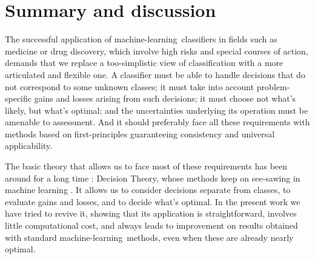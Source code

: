 \documentclass[a4paper,12pt,%
onecolumn,oneside,article,%
british%
]{memoir}
\newcommand*{\puzzle}{{\fontencoding{U}\fontfamily{fontawesometwo}\selectfont\symbol{225}}}
\newcommand{\mynotez}[1]{{\footnotesize\color{notecolour}\puzzle\ #1}}
\newcommand*{\p}{\mathrm{p}}%
\renewcommand*{\|}[1][]{\nonscript\:#1\vert\nonscript\:\mathopen{}}
\newcommand*{\sect}{\S}%
\newcommand*{\eg}{{e.g.}}
\newcommand*{\cf}{{cf.}}
\newcommand*{\ml}{machine-learning}
\begin{document}


\section{Summary and discussion}
\label{sec:summary_discussion}

The successful application of \ml\ classifiers in fields such as medicine or drug discovery, which involve high risks and special courses of action, demands that we replace a too-simplistic view of classification with a more articulated and flexible one. A classifier must be able to handle decisions that do not correspond to some unknown classes; it must take into account problem-specific gains and losses arising from such decisions; it must choose not what's likely, but what's optimal; and the uncertainties underlying its operation must be amenable to assessment. And it should preferably face all these requirements with methods based on first-principles guaranteeing consistency and universal applicability.

The basic theory that allows us to face most of these requirements has been around for a long time \autocites[at least since][]{luceetal1957}[\cf][\sect~1.2]{russelletal1995_r2022}: Decision Theory, whose methods keep on see-sawing in machine learning \autocites[\eg][]{selfetal1987,elkan2001,drummondetal2005}. It allows us to consider decisions separate from classes, to evaluate gains and losses, and to decide what's optimal. In the present work we have tried to revive it, showing that its application is straightforward, involves little computational cost, and always leads to improvement on results obtained with standard \ml\ methods, even when these are already nearly optimal.
\end{document}
